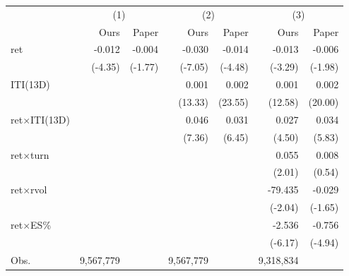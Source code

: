 \begin{tabular}{lrrrrrr}
\toprule
 & \multicolumn{2}{c}{(1)} & \multicolumn{2}{c}{(2)} & \multicolumn{2}{c}{(3)} \\
 & Ours & Paper & Ours & Paper & Ours & Paper \\
\midrule
ret & -0.012 & -0.004 & -0.030 & -0.014 & -0.013 & -0.006 \\
 & (-4.35) & (-1.77) & (-7.05) & (-4.48) & (-3.29) & (-1.98) \\
ITI(13D) &  &  & 0.001 & 0.002 & 0.001 & 0.002 \\
 &  &  & (13.33) & (23.55) & (12.58) & (20.00) \\
ret$\times$ITI(13D) &  &  & 0.046 & 0.031 & 0.027 & 0.034 \\
 &  &  & (7.36) & (6.45) & (4.50) & (5.83) \\
ret$\times$turn &  &  &  &  & 0.055 & 0.008 \\
 &  &  &  &  & (2.01) & (0.54) \\
ret$\times$rvol &  &  &  &  & -79.435 & -0.029 \\
 &  &  &  &  & (-2.04) & (-1.65) \\
ret$\times$ES\% &  &  &  &  & -2.536 & -0.756 \\
 &  &  &  &  & (-6.17) & (-4.94) \\
\midrule
Obs. & 9,567,779 &  & 9,567,779 &  & 9,318,834 &  \\
\bottomrule
\end{tabular}
